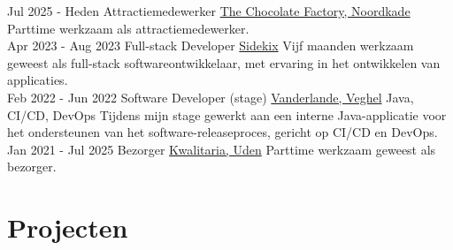 \documentclass[letterpaper]{twentysecondcv_nederlands}
\begin{document}
\begin{twenty}

    \twentyitem
    {Jul 2025 -}
    {Heden}
    {Attractiemedewerker}
    {\href{https://www.thechocolatefactory-noordkade.com/}{The Chocolate Factory, Noordkade}}
    {}
    {
        Parttime werkzaam als attractiemedewerker.
    }\\

    \twentyitem
    {Apr 2023 -}
    {Aug 2023}
    {Full-stack Developer}
    {\href{https://www.sidekix.nl/}{Sidekix}}
    {}
    {
        Vijf maanden werkzaam geweest als full-stack
        softwareontwikkelaar, met ervaring in het
        ontwikkelen van applicaties.
    }\\

    \twentyitem
    {Feb 2022 -}
    {Jun 2022}
    {Software Developer (stage)}
    {\href{https://www.vanderlande.com/}{Vanderlande, Veghel}}
    {Java, CI/CD, DevOps}
    {
        Tijdens mijn stage gewerkt aan een interne
        Java-applicatie voor het ondersteunen van het
        software-releaseproces, gericht op CI/CD en DevOps.
    }\\

    \twentyitem
    {Jan 2021 -}
    {Jul 2025}
    {Bezorger}
    {\href{https://kwalitaria.nl/}{Kwalitaria, Uden}}
    {}
    {
        Parttime werkzaam geweest als bezorger.
    }

\end{twenty}

\vspace{6mm}

\newpage

\makesidebarSecond


\section{Projecten}
\end{document}
